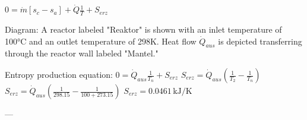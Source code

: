 \( 0 = \dot{m} [s_c - s_a] + \dot{Q} \frac{1}{T} + S_{erz} \)  

Diagram:  
A reactor labeled "Reaktor" is shown with an inlet temperature of 100°C and an outlet temperature of 298K. Heat flow \( \dot{Q}_{aus} \) is depicted transferring through the reactor wall labeled "Mantel."  

Entropy production equation:  
\( 0 = \dot{Q}_{aus} \frac{1}{T_n} + S_{erz} \)  
\( S_{erz} = \dot{Q}_{aus} \left( \frac{1}{T_2} - \frac{1}{T_n} \right) \)  
\( S_{erz} = \dot{Q}_{aus} \left( \frac{1}{298.15} - \frac{1}{100 + 273.15} \right) \)  
\( S_{erz} = 0.0461 \, \text{kJ/K} \)  

---